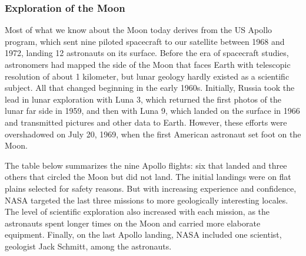 \documentclass{article}
\numberwithin{equation}{section}
\numberwithin{figure}{section}
\begin{document}
\subsubsection*{Exploration of the Moon}
Most of what we know about the Moon today derives from the US Apollo program, which sent nine piloted spacecraft to our satellite between 1968 and 1972, landing 12 astronauts on its surface. Before the era of spacecraft studies, astronomers had mapped the side of the Moon that faces Earth with telescopic resolution of about 1 kilometer, but lunar geology hardly existed as a scientific subject. All that changed beginning in the early 1960s. Initially, Russia took the lead in lunar exploration with Luna 3, which returned the first photos of the lunar far side in 1959, and then with Luna 9, which landed on the surface in 1966 and transmitted pictures and other data to Earth. However, these efforts were overshadowed on July 20, 1969, when the first American astronaut set foot on the Moon.

\vspace{1em}

The table below summarizes the nine Apollo flights: six that landed and three others that circled the Moon but did not land. The initial landings were on flat plains selected for safety reasons. But with increasing experience and confidence, NASA targeted the last three missions to more geologically interesting locales. The level of scientific exploration also increased with each mission, as the astronauts spent longer times on the Moon and carried more elaborate equipment. Finally, on the last Apollo landing, NASA included one scientist, geologist Jack Schmitt, among the astronauts.

\vspace{1em}
\end{document}
